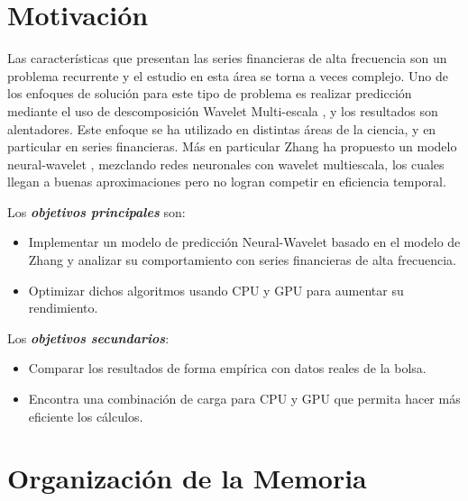 \section{Motivación}

Las características que presentan las series financieras de alta frecuencia son un problema recurrente y el estudio en esta área se torna a veces complejo.
Uno de los enfoques de solución para este tipo de problema es realizar predicción mediante el uso de descomposición Wavelet Multi-escala \cite{benaouda2006wavelet}, y 
los resultados son alentadores. Este enfoque se ha utilizado en distintas áreas de la ciencia, y en particular en series financieras. Más en particular Zhang ha propuesto 
un modelo neural-wavelet \cite{zhang2001adaptive}, mezclando redes neuronales con wavelet multiescala, los cuales llegan a buenas aproximaciones pero no logran competir 
en eficiencia temporal.


Los \emph{\textbf{objetivos principales}} son:
\begin{itemize}
	\item Implementar un modelo de predicción Neural-Wavelet basado en el modelo de Zhang y analizar su comportamiento con series
		financieras de alta frecuencia.
	\item Optimizar dichos algoritmos  usando CPU y GPU para aumentar su rendimiento.
\end{itemize} 

Los \emph{\textbf{objetivos secundarios}}:
\begin{itemize}
	\item Comparar los resultados de forma empírica con datos reales de la bolsa.
	\item Encontra una combinación de carga para CPU y GPU que permita hacer más eficiente los cálculos.
\end{itemize}

\section{Organización de la Memoria}

